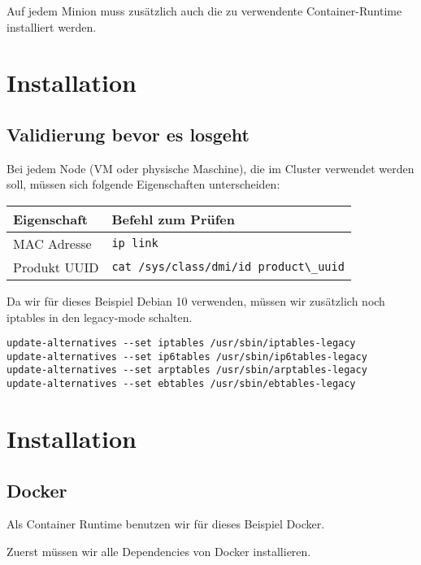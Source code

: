 Auf jedem Minion muss zusätzlich auch die zu verwendente
Container-Runtime installiert werden.

\hypertarget{installation}{%
\section{Installation}\label{installation}}

\hypertarget{validierung-bevor-es-losgeht}{%
\subsection{Validierung bevor es
losgeht}\label{validierung-bevor-es-losgeht}}

Bei jedem Node (VM oder physische Maschine), die im Cluster verwendet
werden soll, müssen sich folgende Eigenschaften unterscheiden:

\begin{longtable}[]{@{}ll@{}}
\toprule
Eigenschaft & Befehl zum Prüfen\tabularnewline
\midrule
\endhead
MAC Adresse & \passthrough{\lstinline!ip link!}\tabularnewline
Produkt UUID &
\passthrough{\lstinline!cat /sys/class/dmi/id product\_uuid!}\tabularnewline
\bottomrule
\end{longtable}

Da wir für dieses Beispiel Debian 10 verwenden, müssen wir zusätzlich
noch iptables in den legacy-mode schalten.

\begin{lstlisting}
update-alternatives --set iptables /usr/sbin/iptables-legacy
update-alternatives --set ip6tables /usr/sbin/ip6tables-legacy
update-alternatives --set arptables /usr/sbin/arptables-legacy
update-alternatives --set ebtables /usr/sbin/ebtables-legacy
\end{lstlisting}

\hypertarget{installation-1}{%
\section{Installation}\label{installation-1}}

\hypertarget{docker}{%
\subsection{Docker}\label{docker}}

Als Container Runtime benutzen wir für dieses Beispiel Docker.

Zuerst müssen wir alle Dependencies von Docker installieren.

